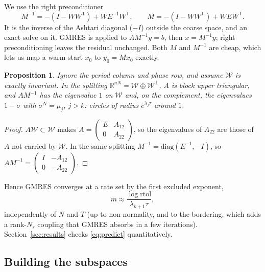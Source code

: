 \documentclass[11pt,a4paper]{article}
\newtheorem{proposition}{Proposition}
\newcommand{\R}{\mathbb{R}}
\newcommand{\tr}{^{\mathsf T}}
\begin{document}
We use the right preconditioner
\begin{equation}
M^{-1} = -(I - WW\tr) + W E^{-1} W\tr, \qquad M = -(I - WW\tr) + W E W\tr .
\label{eq:precond}
\end{equation}
It is the inverse of the Ashtari diagonal ($-I$) outside the coarse space, and an exact solve on it. GMRES is applied to $AM^{-1}y = b$, then $x = M^{-1}y$; right preconditioning leaves the residual unchanged. Both $M$ and $M^{-1}$ are cheap, which lets us map a warm start $x_0$ to $y_0 = Mx_0$ exactly.

\begin{proposition}
Ignore the period column and phase row, and assume $\mathcal W$ is exactly invariant. In the splitting $\R^{nN} = \mathcal W \oplus \mathcal W^\perp$, $A$ is block upper triangular, and $AM^{-1}$ has the eigenvalue $1$ on $\mathcal W$ and, on the complement, the eigenvalues $1 - \sigma$ with $\sigma^N = \mu_j$, $j > k$: circles of radius $e^{\lambda_j\tau}$ around $1$.
\end{proposition}

\begin{proof}
$A\mathcal W \subset \mathcal W$ makes $A = \begin{pmatrix} E & A_{12}\\ 0 & A_{22}\end{pmatrix}$, so the eigenvalues of $A_{22}$ are those of $A$ not carried by $\mathcal W$. In the same splitting $M^{-1} = \mathrm{diag}(E^{-1}, -I)$, so $AM^{-1} = \begin{pmatrix} I & -A_{12} \\ 0 & -A_{22}\end{pmatrix}$.
\end{proof}

Hence GMRES converges at a rate set by the first excluded exponent,
\begin{equation}
m \approx \frac{\log \mathrm{rtol}}{\lambda_{k+1}\tau},
\label{eq:predict}
\end{equation}
independently of $N$ and $T$ (up to non-normality, and to the bordering, which adds a rank-$N_s$ coupling that GMRES absorbs in a few iterations). Section~\ref{sec:results} checks \eqref{eq:predict} quantitatively.

\subsection{Building the subspaces}
\end{document}
